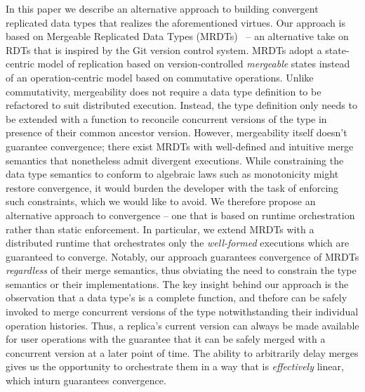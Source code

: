 In this paper we describe an alternative approach to building
convergent replicated data types that realizes the aforementioned
virtues. Our approach is based on Mergeable Replicated Data Types
(MRDTs)~\cite{mrdt} -- an alternative take on RDTs that is inspired by
the Git version control system. MRDTs adopt a state-centric model of
replication based on version-controlled \emph{mergeable} states
instead of an operation-centric model based on commutative operations.
Unlike commutativity, mergeability does not require a data type
definition to be refactored to suit distributed execution. Instead,
the type definition only needs to be extended with a 
function to reconcile concurrent versions of the type in presence of
their common ancestor version. However, mergeability itself doesn't
guarantee convergence; there exist MRDTs with well-defined and
intuitive merge semantics that nonetheless admit divergent executions.
While constraining the data type semantics to conform to algebraic
laws such as monotonicity might restore convergence, it would burden
the developer with the task of enforcing such constraints, which we
would like to avoid. We therefore propose an alternative approach to
convergence -- one that is based on runtime orchestration rather than
static enforcement. In particular, we extend MRDTs with a distributed
runtime that orchestrates only the \emph{well-formed} executions which
are guaranteed to converge. Notably, our approach guarantees
convergence of MRDTs \emph{regardless} of their merge semantics, thus
obviating the need to constrain the type semantics or their
implementations. The key insight behind our approach is the
observation that a data type's  is a complete function, and
thefore can be safely invoked to merge concurrent versions of the type
notwithstanding their individual operation histories. Thus, a
replica's current version can always be made available for user
operations with the guarantee that it can be safely merged with a
concurrent version at a later point of time. The ability to
arbitrarily delay merges gives us the opportunity to orchestrate them
in a way that is \emph{effectively} linear, which inturn guarantees
convergence.

